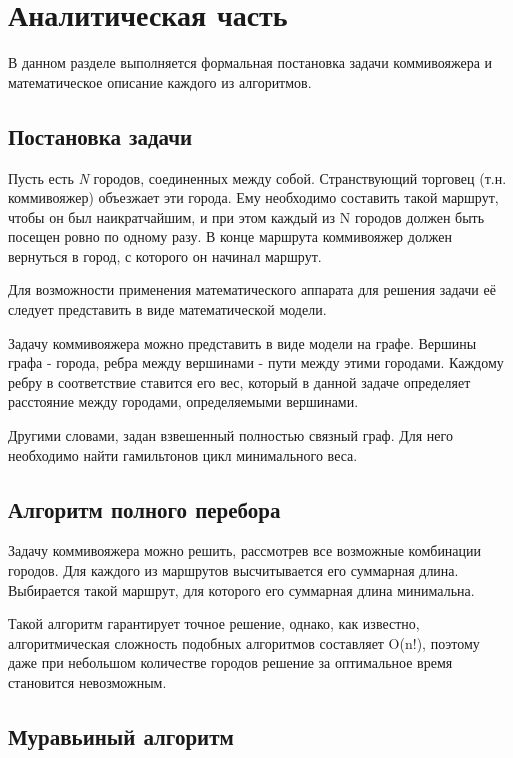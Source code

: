 \chapter{Аналитическая часть}

В данном разделе выполняется формальная постановка задачи коммивояжера и математическое описание каждого из алгоритмов.

\section {Постановка задачи}

Пусть есть \textit{N} городов, соединенных между собой. Странствующий торговец (т.н. коммивояжер) объезжает эти города. Ему необходимо составить такой маршрут, чтобы он был наикратчайшим, и при этом каждый из N городов должен быть посещен ровно по одному разу. В конце маршрута коммивояжер должен вернуться в город, с которого он начинал маршрут.

Для возможности применения математического аппарата для решения задачи её следует представить в виде математической модели.


Задачу коммивояжера можно представить в виде модели на графе.
Вершины графа - города, ребра между вершинами - пути между этими
городами. Каждому ребру в соответствие ставится его вес, который в данной задаче определяет расстояние между городами, определяемыми вершинами.

Другими словами, задан взвешенный полностью связный граф. Для него необходимо найти гамильтонов цикл минимального веса.

\section{Алгоритм полного перебора}
Задачу коммивояжера можно решить, рассмотрев все возможные комбинации городов. Для каждого из маршрутов высчитывается его суммарная длина. Выбирается такой маршрут, для которого его суммарная длина минимальна.

Такой алгоритм гарантирует точное решение, однако, как известно, алгоритмическая сложность подобных алгоритмов составляет O(n!), поэтому даже при небольшом количестве городов решение за оптимальное время становится невозможным.

\section{Муравьиный алгоритм}

